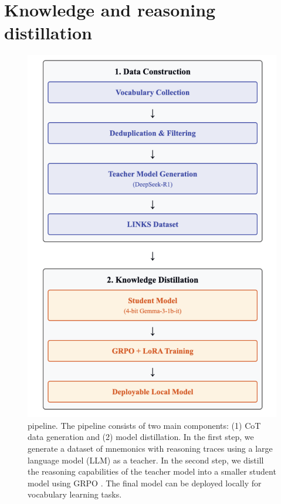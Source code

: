 
\section{Knowledge and reasoning distillation} \label{sec:distillation}

\begin{figure}[htb]
  \centering
  \includegraphics[width=\linewidth]{figures/pipeline.pdf}
  \caption{\links pipeline. The pipeline consists of two main components: (1) CoT data generation and (2) model distillation. In the first step, we generate a dataset of mnemonics with reasoning traces using a large language model (LLM) as a teacher. In the second step, we distill the reasoning capabilities of the teacher model into a smaller student model using GRPO . The final model can be deployed locally for vocabulary learning tasks.}
  \label{fig:distillation}
\end{figure}

